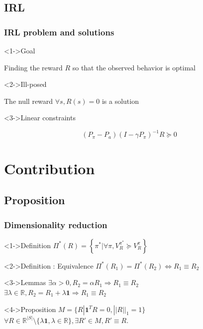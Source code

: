 \documentclass{beamer}
\begin{document}
\subsection{IRL}
\label{sec-2_2}
\begin{frame}
\frametitle{IRL problem and solutions}
\label{sec-2_2_1}
\begin{block}<1->{Goal}
\label{sec-2_2_1_1}

     Finding the reward $R$ so that the observed behavior is optimal
\end{block}
\begin{alertblock}<2->{Ill-posed}
\label{sec-2_2_1_2}

     The null reward $\forall s, R(s) = 0$ is a solution
\end{alertblock}
\begin{block}<3->{Linear constraints}
\label{sec-2_2_1_3}

\begin{equation}
  \label{ng2000algorithms.eqn}
  (P_\pi-P_{a})(I-\gamma P_\pi)^{-1}R\succeq 0
\end{equation}

\end{block}
\end{frame}
\section{Contribution}
\label{sec-3}
\subsection{Proposition}
\label{sec-3_1}
\begin{frame}
\frametitle{Dimensionality reduction}
\begin{block}<1->{Definition}
  $\Pi^*(R) = \left\{\pi^* | \forall \pi, V^{\pi^*}_R\succeq  V^{\pi}_R\right\}$
\end{block}
\begin{block}<2->{Definition : Equivalence}
  $\Pi^*(R_1) = \Pi^*(R_2) \Leftrightarrow R_1 \equiv R_2$
\end{block}
\begin{block}<3->{Lemmas}
$\exists \alpha > 0, R_2=\alpha R_1 \Rightarrow R_1\equiv R_2$\\
$\exists \lambda \in \mathbb{R}, R_2= R_1 + \lambda\mathbf{1} \Rightarrow R_1\equiv R_2$
\end{block}
\begin{alertblock}<4->{Proposition}
   $M = \{R|\mathbf{1}^TR =  0, ||R||_1 = 1\}$\\
   $\forall R \in \mathbb{R}^{|S|}\setminus \{ \lambda \mathbf{1}, \lambda \in \mathbb{R}\}, \exists R'\in M, R'\equiv R$.
\end{alertblock}
\end{frame}
\end{document}
